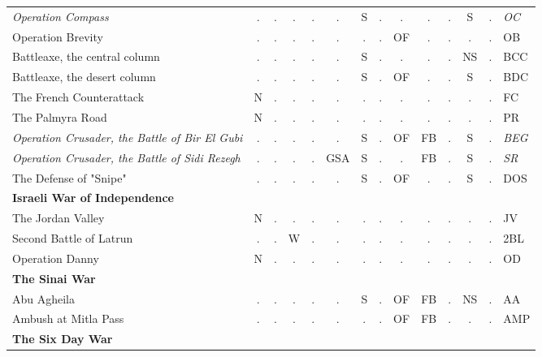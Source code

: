 \documentclass[a4paper]{article}
\newenvironment{texte}{\rmfamily\footnotesize}{}
\begin{document}
\begin{texte}
\begin{tabular}{lccccccccccccl}
\it  Operation Compass                             & . &  . &  . & .  &  .  & S  & . &  . &  . & . &  S & . & \it OC  \\
     Operation Brevity                             & . &  . &  . & .  &  .  & .  & . & OF &  . & . &  . & . &     OB  \\
     Battleaxe, the central column                 & . &  . &  . & .  &  .  & S  & . &  . &  . & . & NS & . &     BCC \\
     Battleaxe, the desert column                  & . &  . &  . & .  &  .  & S  & . & OF &  . & . &  S & . &     BDC \\
     The French Counterattack                      & N &  . &  . & .  &  .  & .  & . &  . &  . & . &  . & . &     FC  \\
     The Palmyra Road                              & N &  . &  . & .  &  .  & .  & . &  . &  . & . &  . & . &     PR  \\
\it  Operation Crusader, the Battle of Bir El Gubi & . &  . &  . & .  &  .  & S  & . & OF & FB & . &  S & . & \it BEG \\
\it  Operation Crusader, the Battle of Sidi Rezegh & . &  . &  . & .  & GSA & S  & . &  . & FB & . &  S & . & \it SR  \\
     The Defense of "Snipe"                        & . &  . &  . & .  &  .  & S  & . & OF &  . & . &  S & . &     DOS \\

\bf Israeli War of Independence \\

     The Jordan Valley                             & N &  . &  . &  . &  .  &  . & . &  . &  . & . &  . & . &     JV  \\
     Second Battle of Latrun                       & . &  . &  W &  . &  .  &  . & . &  . &  . & . &  . & . &     2BL \\
     Operation Danny                               & N &  . &  . &  . &  .  &  . & . &  . &  . & . &  . & . &     OD  \\

\bf The Sinai War \\

     Abu Agheila                                   & . &  . &  . &  . &  .  & S  & . & OF & FB & . & NS & . &     AA  \\
     Ambush at Mitla Pass                          & . &  . &  . &  . &  .  &  . & . & OF & FB & . &  . & . &     AMP \\

\bf The Six Day War \\


\end{tabular}
\end{texte}
\end{document}
